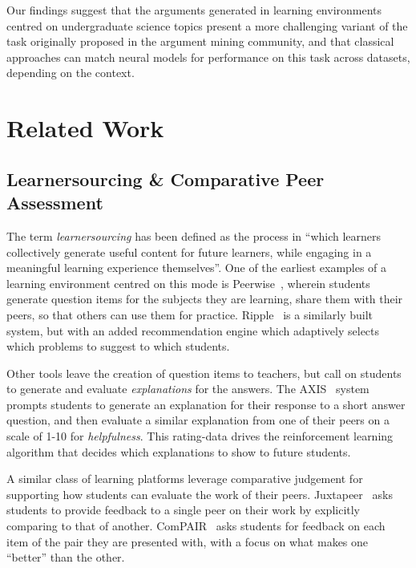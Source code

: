 \documentclass[runningheads]{llncs}
\begin{document}
Our findings suggest that the arguments generated in learning environments 
centred on undergraduate science topics present a more challenging variant of 
the task originally proposed in the argument mining community, and that 
classical approaches can match neural models for performance on this task 
across datasets, depending on the context.

\section{Related Work}


\subsection{Learnersourcing \& Comparative Peer Assessment}
The term \textit{learnersourcing} has been defined as the process in ``which 
learners collectively generate useful content for future learners, while 
engaging in a meaningful learning experience  
themselves''\cite{weir_learnersourcing_2015}.
One of the earliest examples of a learning environment centred on this mode is  
Peerwise~\cite{denny_peerwise:_2008}, wherein students generate question items 
for the subjects they are learning, share them with their peers, so that others 
can use them for practice. 
Ripple~\cite{khosravi_ripple_2019} is a similarly built system, but with an 
added recommendation engine which adaptively selects which problems to suggest 
to which students.

Other tools leave the creation of question items to teachers, but call on 
students to generate and evaluate \textit{explanations} for the answers.
The AXIS~\cite{williams_axis:_2016} system prompts students to
generate an explanation for their response to a short answer question, and then 
evaluate a similar explanation from one of their peers on a scale of 1-10 for 
\textit{helpfulness}. This rating-data drives the reinforcement learning 
algorithm that decides which explanations to show to future students.

A similar class of learning platforms leverage comparative judgement for 
supporting how students can evaluate the work of their peers. 
Juxtapeer~\cite{cambre_juxtapeer:_2018} asks students to provide feedback to a 
single peer on their work by explicitly comparing to that of another.
ComPAIR~\cite{potter_compair:_2017} asks students for feedback on each item of 
the pair they are presented with, with a focus on what makes one ``better'' 
than the other.
\end{document}

